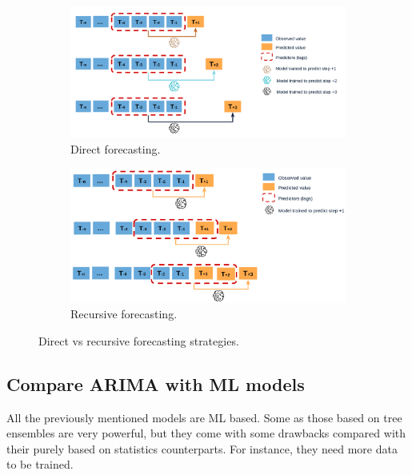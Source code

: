 \begin{figure}[H]
\centering
    \begin{subfigure}{.45\textwidth}
        \centering
        \includegraphics[width=1\linewidth]{images/methodology/direct-multi-step-forecasting}
        \caption{Direct forecasting.}
    \end{subfigure}
    \begin{subfigure}{.45\textwidth}
        \centering
        \includegraphics[width=1\linewidth]{images/methodology/recursive-mutistep-forecasting}
        \caption{Recursive forecasting.}
    \end{subfigure}

    \caption{Direct vs recursive forecasting strategies.}
    \label{fig:direct-recursive-forecasting}
\end{figure}

\subsection{Compare ARIMA with ML models}
All the previously mentioned models are ML based. Some as those based on tree ensembles are very powerful, but they come with some drawbacks compared with their purely based on statistics counterparts. For instance, they need more data to be trained.

